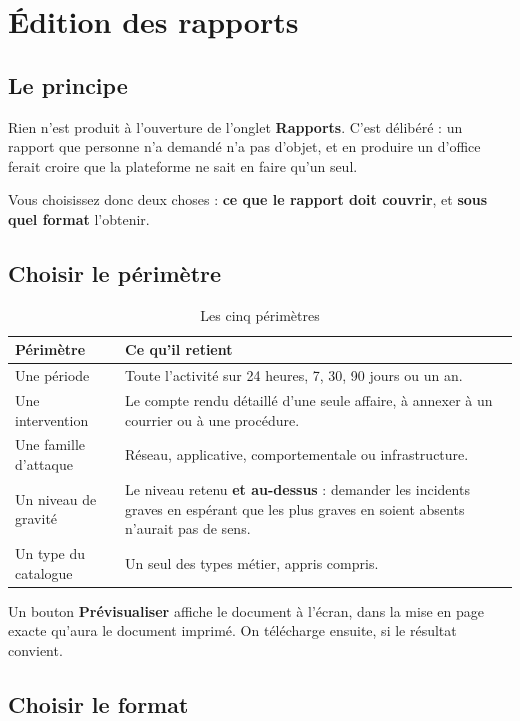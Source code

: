 \chapter{Édition des rapports}
\minitoc

\section{Le principe}

Rien n'est produit à l'ouverture de l'onglet \textbf{Rapports}. C'est
délibéré : un rapport que personne n'a demandé n'a pas d'objet, et en produire
un d'office ferait croire que la plateforme ne sait en faire qu'un seul.

Vous choisissez donc deux choses : \textbf{ce que le rapport doit couvrir}, et
\textbf{sous quel format} l'obtenir.

\section{Choisir le périmètre}

\begin{table}[h]
\centering
\begin{tabular}{@{}p{4.2cm}p{9.6cm}@{}}
\toprule
\textbf{Périmètre} & \textbf{Ce qu'il retient} \\
\midrule
Une période &
Toute l'activité sur 24 heures, 7, 30, 90 jours ou un an. \\[6pt]
Une intervention &
Le compte rendu détaillé d'une seule affaire, à annexer à un courrier ou à une
procédure. \\[6pt]
Une famille d'attaque &
Réseau, applicative, comportementale ou infrastructure. \\[6pt]
Un niveau de gravité &
Le niveau retenu \textbf{et au-dessus} : demander les incidents graves en
espérant que les plus graves en soient absents n'aurait pas de sens. \\[6pt]
Un type du catalogue &
Un seul des types métier, appris compris. \\
\bottomrule
\end{tabular}
\caption{Les cinq périmètres}
\end{table}

Un bouton \textbf{Prévisualiser} affiche le document à l'écran, dans la mise en
page exacte qu'aura le document imprimé. On télécharge ensuite, si le résultat
convient.

\section{Choisir le format}

